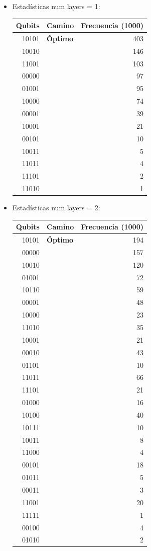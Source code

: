\documentclass[letterpaper]{article}
\begin{document}
\begin{itemize}
\item Estadísticas num layers = 1:
\begin{center}
\begin{tabular}{|r|l|r|}
\hline
\textbf{Qubits} & \textbf{Camino} & \textbf{Frecuencia (1000)}\\
\hline
10101 & \textbf{Óptimo} & 403\\
10010 &  & 146\\
11001 &  & 103\\
00000 &  & 97\\
01001 &  & 95\\
10000 &  & 74\\
00001 &  & 39\\
10001 &  & 21\\
00101 &  & 10\\
10011 &  & 5\\
11011 &  & 4\\
11101 &  & 2\\
11010 &  & 1\\
\hline
\end{tabular}
\end{center}

\item Estadísticas num layers = 2:
\begin{center}
\begin{tabular}{|r|l|r|}
\hline
\textbf{Qubits} & \textbf{Camino} & \textbf{Frecuencia (1000)}\\
\hline
10101 & \textbf{Óptimo} & 194\\
00000 &  & 157\\
10010 &  & 120\\
01001 &  & 72\\
10110 &  & 59\\
00001 &  & 48\\
10000 &  & 23\\
11010 &  & 35\\
10001 &  & 21\\
00010 &  & 43\\
01101 &  & 10\\
11011 &  & 66\\
11101 &  & 21\\
01000 &  & 16\\
10100 &  & 40\\
10111 &  & 10\\
10011 &  & 8\\
11000 &  & 4\\
00101 &  & 18\\
01011 &  & 5\\
00011 &  & 3\\
11001 &  & 20\\
11111 &  & 1\\
00100 &  & 4\\
01010 &  & 2\\
\hline
\end{tabular}
\end{center}


\end{itemize}
\end{document}
